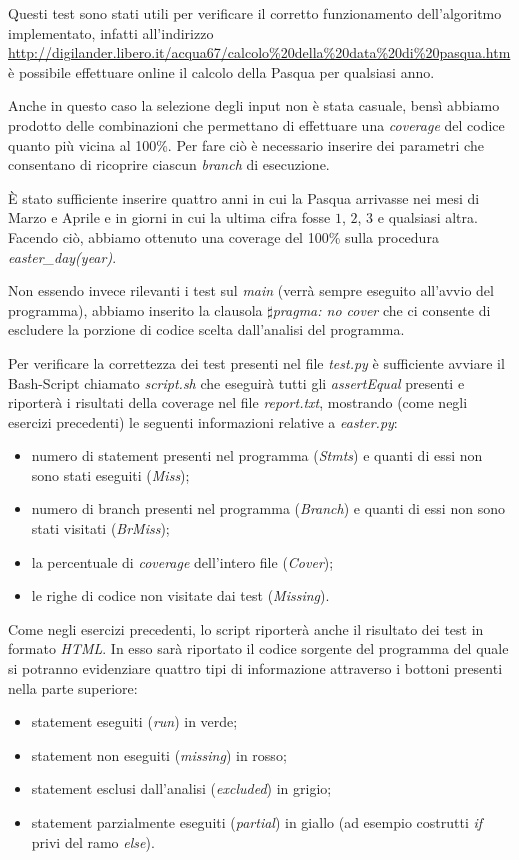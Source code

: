 \documentclass[a4paper, 12pt]{article}
\begin{document}
	Questi test sono stati utili per verificare il corretto funzionamento dell'algoritmo implementato, infatti all'indirizzo \url{http://digilander.libero.it/acqua67/calcolo\%20della\%20data\%20di\%20pasqua.htm} è possibile effettuare online il calcolo della Pasqua per qualsiasi anno.
	
	Anche in questo caso la selezione degli input non è stata casuale, bensì abbiamo prodotto delle combinazioni che permettano di effettuare una \textit{coverage} del codice quanto più vicina al 100\%. Per fare ciò è necessario inserire dei parametri che consentano di ricoprire ciascun \textit{branch} di esecuzione.
	
	\MakeUppercase{è} stato sufficiente inserire quattro anni in cui la Pasqua arrivasse nei mesi di Marzo e Aprile e in giorni in cui la ultima cifra fosse $1$, $2$, $3$ e qualsiasi altra. Facendo ciò, abbiamo ottenuto una coverage del 100\% sulla procedura \textit{easter\_day(year)}.
	
	Non essendo invece rilevanti i test sul \textit{main} (verrà sempre eseguito all'avvio del programma), abbiamo inserito la clausola \textit{$\sharp$pragma: no cover} che ci consente di escludere la porzione di codice scelta dall'analisi del programma.
	
	Per verificare la correttezza dei test presenti nel file \textit{test.py} è sufficiente avviare il Bash-Script chiamato \textit{script.sh} che eseguirà tutti gli \textit{assertEqual} presenti e riporterà i risultati della coverage nel file \textit{report.txt}, mostrando (come negli esercizi precedenti) le seguenti informazioni relative a \textit{easter.py}:
	\begin{itemize}
		\item numero di statement presenti nel programma (\textit{Stmts}) e quanti di essi non sono stati eseguiti (\textit{Miss});
		\item numero di branch presenti nel programma (\textit{Branch}) e quanti di essi non sono stati visitati (\textit{BrMiss});
		\item la percentuale di \textit{coverage} dell'intero file (\textit{Cover});
		\item le righe di codice non visitate dai test (\textit{Missing}).
		
	\end{itemize}
	
	\noindent
	Come negli esercizi precedenti, lo script riporterà anche il risultato dei test in formato \textit{HTML}. In esso sarà riportato il codice sorgente del programma del quale si potranno evidenziare quattro tipi di informazione attraverso i bottoni presenti nella parte superiore:
	\begin{itemize}
		\item statement eseguiti (\textit{run}) in verde;
		\item statement non eseguiti (\textit{missing}) in rosso;
		\item statement esclusi dall'analisi (\textit{excluded}) in grigio;
		\item statement parzialmente eseguiti (\textit{partial}) in giallo (ad esempio costrutti \textit{if} privi del ramo \textit{else}).
	\end{itemize}
	
\end{document}
